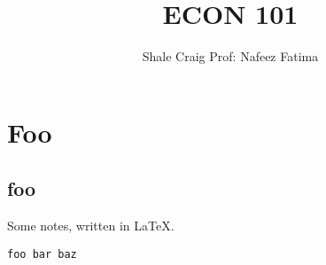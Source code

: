 \ifdefined\isphone
  
\else
  
\fi

\usepackage{listings}

\title{ECON 101}

\author{Shale Craig
Prof: Nafeez Fatima}

\lstset{language=Pascal}


    \maketitle

    \tableofcontents

    \mainmatter

    \chapter{Foo} %
    \label{cha:foo}
        \section{foo} %
        \label{sec:foo}
            Some notes, written in \LaTeX.
            \begin{lstlisting}
foo bar baz
            \end{lstlisting}


